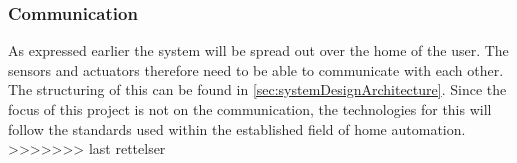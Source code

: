 \subsubsection{Communication}
As expressed earlier the system will be spread out over the home of the user. The sensors and actuators therefore need to be able to communicate with each other. The structuring of this can be found in \cref{sec:systemDesignArchitecture}. Since the focus of this project is not on the communication, the technologies for this will follow the standards used within the established field of home automation.
>>>>>>> last rettelser
